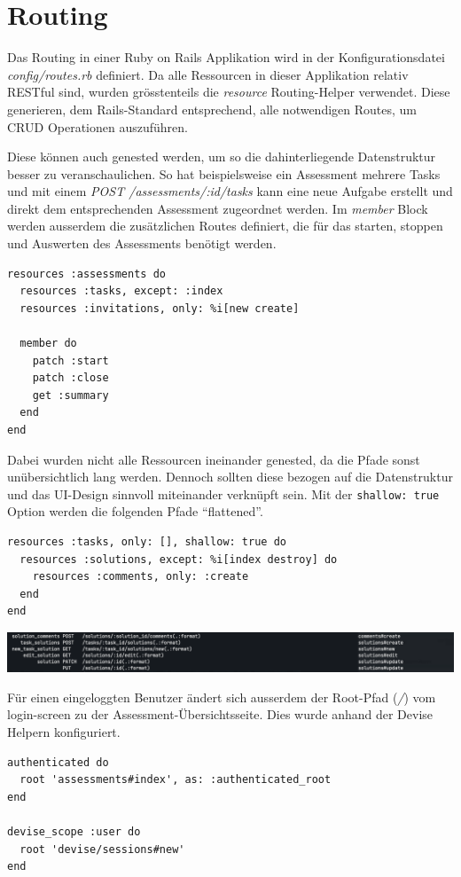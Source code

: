 \section{Routing}

Das Routing in einer Ruby on Rails Applikation wird in der Konfigurationsdatei \emph{config/routes.rb} definiert.
Da alle Ressourcen in dieser Applikation relativ RESTful sind, wurden grösstenteils die \emph{resource} Routing-Helper verwendet.
Diese generieren, dem Rails-Standard \cite{default_controller_actions} entsprechend, alle notwendigen Routes, um CRUD Operationen auszuführen.

Diese können auch genested werden, um so die dahinterliegende Datenstruktur besser zu veranschaulichen. So hat beispielsweise
ein Assessment mehrere Tasks und mit einem \emph{POST /assessments/:id/tasks} kann eine neue Aufgabe erstellt und direkt dem entsprechenden Assessment
zugeordnet werden. Im \emph{member} Block werden ausserdem die zusätzlichen Routes definiert, die für das starten, stoppen und Auswerten des Assessments
benötigt werden.

\begin{codebox}
\begin{verbatim}
resources :assessments do
  resources :tasks, except: :index
  resources :invitations, only: %i[new create]

  member do
    patch :start
    patch :close
    get :summary
  end
end
\end{verbatim}
\end{codebox}

Dabei wurden nicht alle Ressourcen ineinander genested, da die Pfade sonst unübersichtlich lang werden.
Dennoch sollten diese bezogen auf die Datenstruktur und das UI-Design sinnvoll miteinander verknüpft sein. Mit der \texttt{shallow: true}
Option werden die folgenden Pfade \enquote{flattened}.

\begin{codebox}
\begin{verbatim}
resources :tasks, only: [], shallow: true do
  resources :solutions, except: %i[index destroy] do
    resources :comments, only: :create
  end
end
\end{verbatim}
\end{codebox}

\includegraphics[width=\textwidth]{images/routes.png}

Für einen eingeloggten Benutzer ändert sich ausserdem der Root-Pfad (\emph{/}) vom login-screen zu der Assessment-Übersichtsseite.
Dies wurde anhand der Devise Helpern konfiguriert.

\begin{codebox}
\begin{verbatim}
authenticated do
  root 'assessments#index', as: :authenticated_root
end

devise_scope :user do
  root 'devise/sessions#new'
end
\end{verbatim}
\end{codebox}
